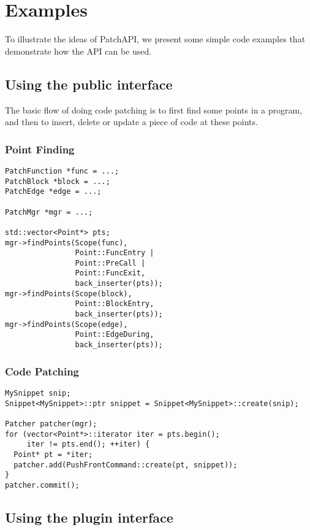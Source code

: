 \section{Examples} \label{sec-3}
To illustrate the ideas of PatchAPI, we present some simple code examples that
demonstrate how the API can be used.

\subsection{Using the public interface}
The basic flow of doing code patching is to first find some points in a program,
and then to insert, delete or update a piece of code at these points.
\subsubsection{Point Finding}

\lstset{numbers=left}
\begin{lstlisting}
PatchFunction *func = ...;
PatchBlock *block = ...;
PatchEdge *edge = ...;

PatchMgr *mgr = ...;

std::vector<Point*> pts;
mgr->findPoints(Scope(func),
                Point::FuncEntry | 
                Point::PreCall | 
                Point::FuncExit,
                back_inserter(pts));
mgr->findPoints(Scope(block),
                Point::BlockEntry,
                back_inserter(pts));
mgr->findPoints(Scope(edge),
                Point::EdgeDuring,
                back_inserter(pts));
\end{lstlisting}


\subsubsection{Code Patching}

\lstset{numbers=left}
\begin{lstlisting}
MySnippet snip;
Snippet<MySnippet>::ptr snippet = Snippet<MySnippet>::create(snip);

Patcher patcher(mgr);
for (vector<Point*>::iterator iter = pts.begin();
     iter != pts.end(); ++iter) {
  Point* pt = *iter;
  patcher.add(PushFrontCommand::create(pt, snippet));
}
patcher.commit();
\end{lstlisting}

\subsection{Using the plugin interface}

